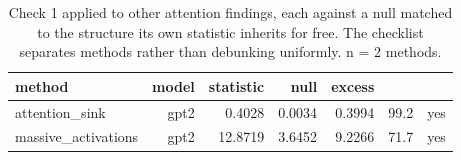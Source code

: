 \begin{table}[t]
  \centering
  \caption{Check 1 applied to other attention findings, each against a null matched to the structure its own statistic inherits for free. The checklist separates methods rather than debunking uniformly. n = 2 methods.}
  \label{tab:t3}
  \begin{tabular}{lrrrrrr}
    \toprule
    method & model & statistic & null & excess & \\%
    \midrule
    attention\_sink & gpt2 & 0.4028 & 0.0034 & 0.3994 & 99.2 & yes \\
    massive\_activations & gpt2 & 12.8719 & 3.6452 & 9.2266 & 71.7 & yes \\
    \bottomrule
  \end{tabular}
\end{table}
